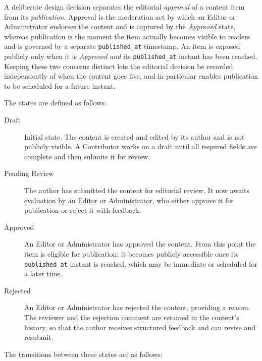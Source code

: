 A deliberate design decision separates the editorial \emph{approval} of a content
item from its \emph{publication}. Approval is the moderation act by which an Editor or
Administrator endorses the content and is captured by the \textit{Approved} state,
whereas publication is the moment the item actually becomes visible to readers and is
governed by a separate \texttt{published\_at} timestamp. An item is exposed publicly
only when it is \textit{Approved} \emph{and} its \texttt{published\_at} instant has
been reached. Keeping these two concerns distinct lets the editorial decision be
recorded independently of when the content goes live, and in particular enables
publication to be scheduled for a future instant.

The states are defined as follows:

\begin{description}
      \item[Draft] Initial state. The content is created and edited by its author and
            is not publicly visible. A Contributor works on a draft until all required
            fields are complete and then submits it for review.

      \item[Pending Review] The author has submitted the content for editorial review.
            It now awaits evaluation by an Editor or Administrator, who either approve it
            for publication or reject it with feedback.

      \item[Approved] An Editor or Administrator has approved the content. From this
            point the item is eligible for publication; it becomes publicly accessible
            once its \texttt{published\_at} instant is reached, which may be immediate or
            scheduled for a later time.

      \item[Rejected] An Editor or Administrator has rejected the content, providing a
            reason. The reviewer and the rejection comment are retained in the
            content's history, so that the author receives structured feedback and can
            revise and resubmit.
\end{description}

The transitions between these states are as follows:

